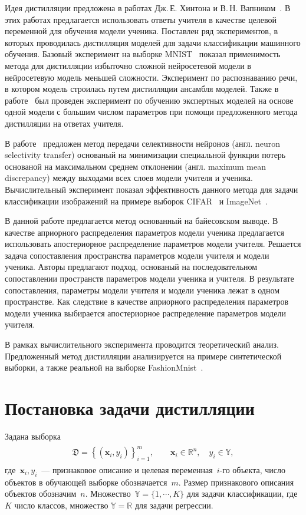 \documentclass[12pt]{a&t}
\begin{document}
Идея дистилляции предложена в работах Дж.\,Е. Хинтона и В.\,Н. Вапником~\cite{Hinton2015, Vapnik2015, Lopez2016}. В этих работах предлагается использовать ответы учителя в качестве целевой переменной для обучения модели ученика. Поставлен ряд экспериментов, в которых проводилась дистилляция моделей для задачи классификации машинного обучения. Базовый эксперимент на выборке MNIST~\cite{mnist} показал применимость метода для дистилляции избыточно сложной нейросетевой модели в нейросетевую модель меньшей сложности. Эксперимент по распознаванию речи, в котором модель строилась путем дистилляции ансамбля моделей. Также в работе~\cite{Hinton2015} был проведен эксперимент по обучению экспертных моделей на основе одной модели с большим числом параметров при помощи предложенного метода дистилляции на ответах учителя.

В работе~\cite{Zehao2017} предложен метод передачи селективности нейронов (англ. neuron selectivity transfer) основаный на минимизации специальной функции потерь основаной на максимальном среднем отклонении (англ. maximum mean discrepancy) между выходами всех слоев модели учителя и ученика. Вычислительный эксперимент показал эффективность данного метода для задачи классификации изображений на примере выборок CIFAR~\cite{cifar10} и ImageNet~\cite{imagenet}.

В данной работе предлагается метод основанный на байесовском выводе.
В качестве априорного распределения параметров модели ученика предлагается использовать апостериорное распределение параметров модели учителя.
Решается задача сопоставления пространства параметров модели учителя и модели ученика.
Авторы предлагают подход, основаный на последовательном сопоставлении пространств параметров модели ученика и учителя.
В результате сопоставления, параметры модели учителя и модели ученика лежат в одном пространстве. Как следствие в качестве априорного распределения параметров модели ученика выбирается апостериорное распределение параметров модели учителя.

В рамках вычислительного эксперимента проводится теоретический анализ. Предложенный метод дистилляции анализируется на примере синтетической выборки, а также реальной на выборке FashionMnist~\cite{fashionmnist}.

\section{Постановка задачи дистилляции}
Задана выборка
\begin{gather}
\label{eq:st:1}
\begin{aligned}
\mathfrak{D} = \left\{\left(\mathbf{x}_i, y_i\right)\right\}_{i=1}^{m}, \qquad \mathbf{x}_i \in \mathbb{R}^{n}, \quad y_i \in \mathbb{Y},
\end{aligned}
\end{gather}
где~$\mathbf{x}_i, y_i$~--- признаковое описание и целевая переменная~$i$-го объекта, число объектов в обучающей выборке обозначается~$m$. Размер признакового описания объектов обозначим~$n$. Множество~$\mathbb{Y}=\{1,\cdots,K\}$ для задачи классификации, где~$K$ число классов, множество $\mathbb{Y}=\mathbb{R}$ для задачи регрессии.
\end{document}
